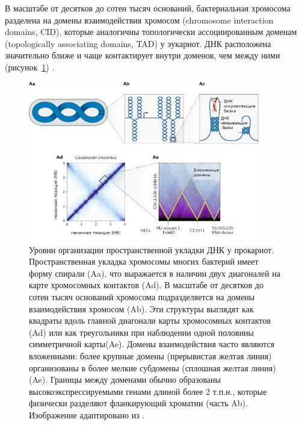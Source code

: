 В масштабе от десятков до сотен тысяч оснований, бактериальная хромосома разделена на домены взаимодействия хромосом (chromosome interaction domains, CID), которые аналогичны топологически ассоциированным доменам (topologically associating domains, TAD) у эукариот. ДНК расположена значительно ближе и чаще контактирует внутри доменов, чем между ними (рисунок~\ref{img:chr3d}) \cite{dame2020chromosome}. 

\begin{figure}[!ht] 
  \center
  \includegraphics [width=0.9\textwidth] {Dissertation/images/lit/chromosome3d_1.png}
  \caption{Уровни организации пространственной укладки ДНК у прокариот. Пространственная укладка хромосомы многих бактерий имеет форму спирали (Aa), что выражается в наличии двух диагоналей на карте хромосомных контактов (Ad). В масштабе от десятков до сотен тысяч оснований хромосома подразделяется на домены взаимодействия хромосом (Ab). Эти структуры выглядят как квадраты вдоль главной диагонали карты хромосомных контактов (Ad) или как треугольники при наблюдении одной половины симметричной карты(Ae). Домены взаимодействия часто являются вложенными: более крупные домены (прерывистая желтая линия) организованы в более мелкие субдомены (сплошная желтая линия) (Ae). Границы между доменами обычно образованы высокоэкспрессируемыми генами длиной более 2 т.п.н., которые физически разделяют фланкирующий хроматин (часть Ab). Изображение адаптировано из \cite{dame2020chromosome}.} 
  \label{img:chr3d}  
\end{figure}

